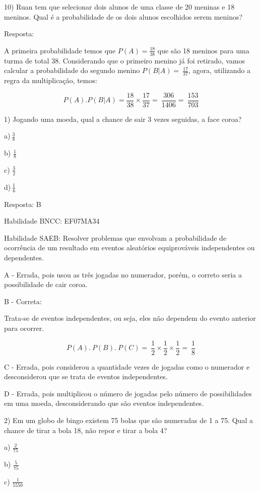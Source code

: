 {{{{{{{{{{{{{10) Ruan tem que selecionar dois alunos de uma classe de 20 meninas e 18
meninos. Qual é a probabilidade de os dois alunos escolhidos serem
meninos?

Resposta:

A primeira probabilidade temos que \(P(A) = \frac{18}{38}\) que são 18
meninos para uma turma de total 38. Considerando que o primeiro menino
já foi retirado, vamos calcular a probabilidade do segundo menino
\(P(B|A) = \ \frac{17}{37}\), agora, utilizando a regra da
multiplicação, temos:

\[P(A).P(B|A) = \frac{18}{38} \times \frac{17}{37} = \ \frac{306}{1406} = \ \frac{153}{703}\]


1) Jogando uma moeda, qual a chance de sair 3 vezes seguidas, a face
coroa?

a)\(\ \frac{3}{8}\)

b) \(\frac{1}{8}\)

c) \(\frac{3}{2}\)

d)\(\ \frac{1}{6}\)

Resposta: B

Habilidade BNCC: EF07MA34

Habilidade SAEB: Resolver problemas que envolvam a probabilidade de
ocorrência de um resultado em eventos aleatórios equiprováveis
independentes ou dependentes.

A - Errada, pois usou as três jogadas no numerador, porém, o correto
seria a possibilidade de cair coroa.

B - Correta:

Trata-se de eventos independentes, ou seja, eles não dependem do evento
anterior para ocorrer.

\[P(A).\ P(B).\ P(C) = \ \frac{1}{2} \times \frac{1}{2} \times \frac{1}{2} = \ \frac{1}{8}\]

C - Errada, pois considerou a quantidade vezes de jogadas como o
numerador e desconsiderou que se trata de eventos independentes.

D - Errada, pois multiplicou o número de jogadas pelo número de
possibilidades em uma moeda, desconsiderando que são eventos
independentes.

2) Em um globo de bingo existem 75 bolas que são numeradas de 1 a 75.
Qual a chance de tirar a bola 18, não repor e tirar a bola 4?

a) \(\frac{2}{75}\)

b) \(\frac{5}{75}\)

c) \(\frac{1}{5550}\)

}}}}}}}}}}}}}
